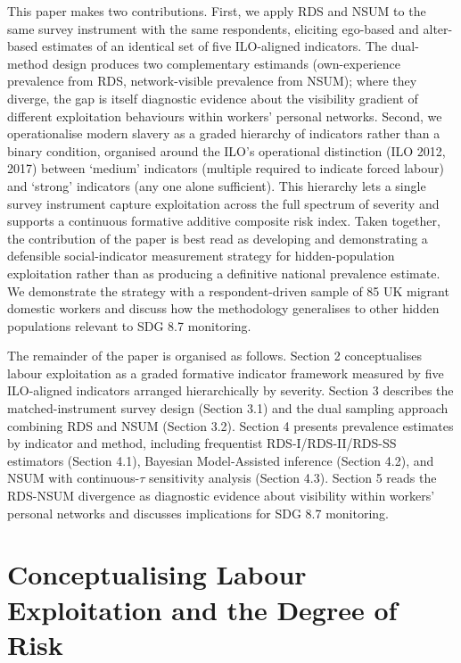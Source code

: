\documentclass[
  12pt,
  letterpaper,
  DIV=11,
  numbers=noendperiod]{scrartcl}
\begin{document}
This paper makes two contributions. First, we apply RDS and NSUM to the
same survey instrument with the same respondents, eliciting ego-based
and alter-based estimates of an identical set of five ILO-aligned
indicators. The dual-method design produces two complementary estimands
(own-experience prevalence from RDS, network-visible prevalence from
NSUM); where they diverge, the gap is itself diagnostic evidence about
the visibility gradient of different exploitation behaviours within
workers' personal networks. Second, we operationalise modern slavery as
a graded hierarchy of indicators rather than a binary condition,
organised around the ILO's operational distinction (ILO 2012, 2017)
between `medium' indicators (multiple required to indicate forced
labour) and `strong' indicators (any one alone sufficient). This
hierarchy lets a single survey instrument capture exploitation across
the full spectrum of severity and supports a continuous formative
additive composite risk index. Taken together, the contribution of the
paper is best read as developing and demonstrating a defensible
social-indicator measurement strategy for hidden-population exploitation
rather than as producing a definitive national prevalence estimate. We
demonstrate the strategy with a respondent-driven sample of 85 UK
migrant domestic workers and discuss how the methodology generalises to
other hidden populations relevant to SDG 8.7 monitoring.

The remainder of the paper is organised as follows. Section 2
conceptualises labour exploitation as a graded formative indicator
framework measured by five ILO-aligned indicators arranged
hierarchically by severity. Section 3 describes the matched-instrument
survey design (Section 3.1) and the dual sampling approach combining RDS
and NSUM (Section 3.2). Section 4 presents prevalence estimates by
indicator and method, including frequentist RDS-I/RDS-II/RDS-SS
estimators (Section 4.1), Bayesian Model-Assisted inference (Section
4.2), and NSUM with continuous-\(\tau\) sensitivity analysis (Section
4.3). Section 5 reads the RDS-NSUM divergence as diagnostic evidence
about visibility within workers' personal networks and discusses
implications for SDG 8.7 monitoring.

\section{Conceptualising Labour Exploitation and the Degree of
Risk}\label{conceptualising-labour-exploitation-and-the-degree-of-risk}
\end{document}
